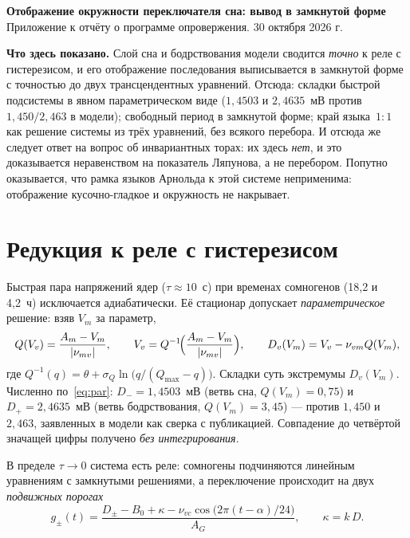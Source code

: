 \documentclass[11pt,a4paper]{article}
\begin{document}
\begin{center}
{\large\bfseries Отображение окружности переключателя сна: вывод в замкнутой форме}\\[2pt]
{\small Приложение к отчёту о программе опровержения. 30 октября 2026 г.}
\end{center}
\vspace{-2pt}

\noindent\textbf{Что здесь показано.} Слой сна и бодрствования модели сводится \emph{точно} к реле
с гистерезисом, и его отображение последования выписывается в замкнутой форме с точностью до двух
трансцендентных уравнений. Отсюда: складки быстрой подсистемы в явном параметрическом виде
($1{,}4503$ и $2{,}4635$~мВ против $1{,}450/2{,}463$ в модели); свободный период в замкнутой форме;
край языка~$1{:}1$ как решение системы из трёх уравнений, без всякого перебора. И отсюда же следует
ответ на вопрос об инвариантных торах: их здесь \emph{нет}, и это доказывается неравенством на
показатель Ляпунова, а не перебором. Попутно оказывается, что рамка языков Арнольда к этой системе
неприменима: отображение кусочно-гладкое и окружность не накрывает.

\section{Редукция к реле с гистерезисом}
Быстрая пара напряжений ядер ($\tau\approx10$~с) при временах сомногенов (18{,}2 и 4{,}2~ч)
исключается адиабатически. Её стационар допускает \emph{параметрическое} решение: взяв $V_m$ за
параметр,
\begin{equation}\label{eq:par}
Q(V_v)=\frac{A_m-V_m}{|\nu_{mv}|},\qquad V_v=Q^{-1}\!\Bigl(\frac{A_m-V_m}{|\nu_{mv}|}\Bigr),\qquad
D_v(V_m)=V_v-\nu_{vm}Q(V_m),
\end{equation}
где $Q^{-1}(q)=\theta+\sigma_Q\ln\bigl(q/(Q_{\max}-q)\bigr)$. Складки суть экстремумы
$D_v(V_m)$. Численно по~\eqref{eq:par}: $D_-=1{,}4503$~мВ (ветвь сна, $Q(V_m)=0{,}75$) и
$D_+=2{,}4635$~мВ (ветвь бодрствования, $Q(V_m)=3{,}45$) --- против $1{,}450$ и $2{,}463$,
заявленных в модели как сверка с публикацией. Совпадение до четвёртой значащей цифры получено
\emph{без интегрирования}.

В пределе $\tau\to0$ система есть реле: сомногены подчиняются линейным уравнениям с замкнутыми
решениями, а переключение происходит на двух \emph{подвижных порогах}
\begin{equation}\label{eq:thr}
g_\pm(t)=\frac{D_\pm-B_0+\kappa-\nu_{vc}\cos\bigl(2\pi(t-\alpha)/24\bigr)}{A_G},
\qquad \kappa=k\,D .
\end{equation}
\end{document}
